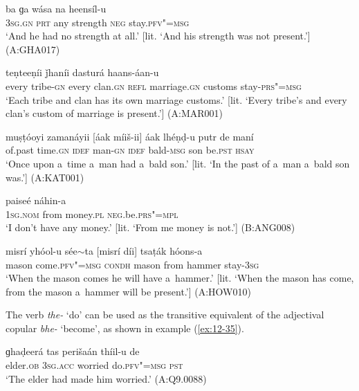 \begin{exe}
\ex
\label{ex:12-30}
\gll [tasíi] ba ɡa wása na heensíl-u \\
\textsc{3sg.gn} \textsc{prt} any strength \textsc{neg} stay.\textsc{pfv"=msg} \\
\glt `And he had no strength at all.' [lit. `And his strength was not present.'] (A:GHA017)
\end{exe}
\begin{exe}
\ex
\label{ex:12-31}
 teṇteeṇíi ǰhaníi dasturá haans-áan-u \\
every tribe-\textsc{gn} every clan.\textsc{gn} \textsc{refl} marriage.\textsc{gn}  customs stay-\textsc{prs"=msg} \\
\glt `Each tribe and clan has its own marriage customs.' [lit. `Every tribe's and every clan's custom of marriage is present.'] (A:MAR001)

\ex
\label{ex:12-32}
\gll muṣṭóoyi zamanáyii [áak míiš-ii] áak lhéṇḍ-u putr de maní \\
of.past time.\textsc{gn} \textsc{idef} man-\textsc{gn} \textsc{idef} bald-\textsc{msg} son be.\textsc{pst} \textsc{hsay} \\
\glt `Once upon a~time a~man had a~bald son.' [lit. `In the past of a~man a~bald son was.'] (A:KAT001)
\end{exe}
\begin{exe}
\ex
\label{ex:12-33}
\gll [ma díi] paiseé náhin-a \\
\textsc{1sg.nom} from money.\textsc{pl} \textsc{neg}.be.\textsc{prs"=mpl} \\
\glt `I don't have any money.' [lit. `From me money is not.'] (B:ANG008)
\end{exe}
\begin{exe}
\ex
\label{ex:12-34}
\gll misrí yhóol-u sée$\sim$ta [misrí díi] tsaṭák hóons-a \\
mason come.\textsc{pfv"=msg} \textsc{condh} mason from hammer stay-\textsc{3sg} \\
\glt `When the mason comes he will have a~hammer.' [lit. `When the mason has come, from the mason a~hammer will be present.'] (A:HOW010)
\end{exe}

 The verb \textit{the-} `do' can be used as the transitive equivalent of the adjectival copular \textit{bhe-} `become', as shown in example (\ref{ex:12-35}).

\begin{exe}
\ex
\label{ex:12-35}
\gll ɡhaḍeerá tas perišaán thíil-u de \\
elder.\textsc{ob} \textsc{3sg.acc} worried do.\textsc{pfv"=msg} \textsc{pst} \\
\glt `The elder had made him worried.' (A:Q9.0088)
\end{exe}

